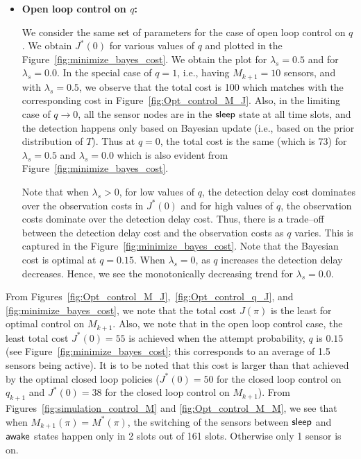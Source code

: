 \documentclass[journal]{IEEEtran}
\newcommand{\sleep}{{${\sf sleep }$}}
\newcommand{\wake}{{${\sf awake }$}}
\begin{document}
\begin{itemize}
\item {\bf Open loop control on $q$:}


We consider the same set of parameters for the case of open loop control
on $q$. We obtain $J^*(0)$ for various values of $q$ and plotted in the
Figure~\ref{fig:minimize_bayes_cost}.  We obtain the plot for $\lambda_s
= 0.5$ and for $\lambda_s = 0.0$. In the special case of $q=1$, i.e.,
having $M_{k+1} = 10$ sensors, and with $\lambda_s = 0.5$, we observe
that the total cost is 100 which matches with the corresponding cost in
Figure~\ref{fig:Opt_control_M_J}. Also, in the limiting case of $q \to
0$, all the sensor nodes are in the {\sleep} state at all time slots,
and the detection happens only based on Bayesian update (i.e., based on 
the prior distribution of $T$). Thus at $q = 0$, the total cost is the
same (which is 73) for $\lambda_s = 0.5$ and 
$\lambda_s = 0.0$ which is also evident from 
Figure~\ref{fig:minimize_bayes_cost}.


Note that when $\lambda_s > 0$, for
low values of $q$, the detection delay cost dominates over the
observation costs in $J^*(0)$ and for high values of $q$, the
observation costs dominate over the detection delay cost. Thus, there is
a trade--off between the detection delay cost and the observation costs
as $q$ varies. This is captured in the
Figure~\ref{fig:minimize_bayes_cost}. Note that the Bayesian cost is
optimal at $q = 0.15$.  When $\lambda_s = 0$, as $q$ increases the
detection delay decreases. Hence, we see the monotonically decreasing
trend for  $\lambda_s = 0.0$.       
\end{itemize}
 
  
From Figures~\ref{fig:Opt_control_M_J},~\ref{fig:Opt_control_q_J},
and \ref{fig:minimize_bayes_cost}, we note that the total cost
$J(\pi)$ is the least for optimal control on $M_{k+1}$. Also, we note
that in the open loop control case, the least total cost $J^*(0) = 55$
is achieved when the attempt probability, $q$ is $0.15$ 
(see Figure~\ref{fig:minimize_bayes_cost}; this
corresponds to an average of 1.5 sensors being {\sf active}). It is to be noted that
this cost is larger than that achieved by the optimal closed loop
policies ($J^*(0) = 50$ for the closed loop control on $q_{k+1}$ and
$J^*(0) = 38$ for the closed loop control on $M_{k+1}$). From
Figures~\ref{fig:simulation_control_M} and
\ref{fig:Opt_control_M_M}, we see that when $M_{k+1}(\pi) =
M^*(\pi)$, the switching of the sensors between {\sleep} and 
{\wake} states happen only in 2 slots out of 161 slots. Otherwise
only 1 sensor is on. 
\end{document}
